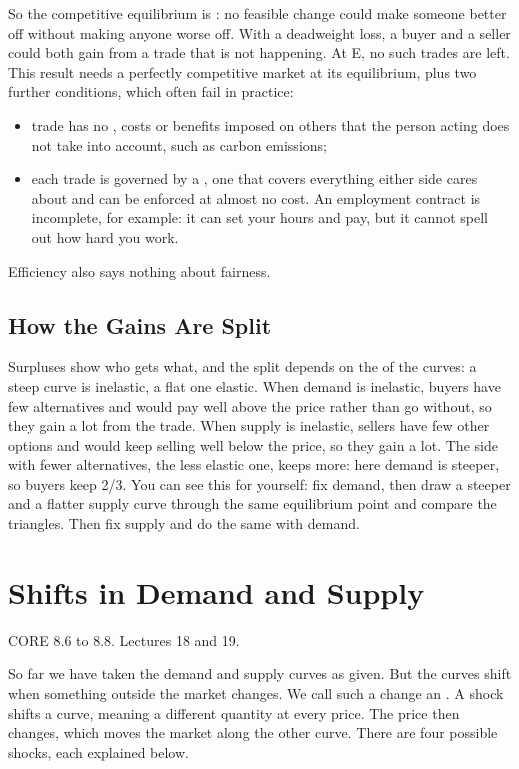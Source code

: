 \documentclass[11pt]{article}
\newcommand{\secinfo}[1]{{\small\color{muted}#1\par}\vspace{2pt}}
\begin{document}
So the competitive equilibrium is : no feasible change could make someone better off without making anyone worse off. With a deadweight loss, a buyer and a seller could both gain from a trade that is not happening. At E, no such trades are left. This result needs a perfectly competitive market at its equilibrium, plus two further conditions, which often fail in practice:
\begin{itemize}
\item trade has no , costs or benefits imposed on others that the person acting does not take into account, such as carbon emissions;
\item each trade is governed by a , one that covers everything either side cares about and can be enforced at almost no cost. An employment contract is incomplete, for example: it can set your hours and pay, but it cannot spell out how hard you work.
\end{itemize}
Efficiency also says nothing about fairness.

\subsection{How the Gains Are Split}

Surpluses show who gets what, and the split depends on the  of the curves: a steep curve is inelastic, a flat one elastic. When demand is inelastic, buyers have few alternatives and would pay well above the price rather than go without, so they gain a lot from the trade. When supply is inelastic, sellers have few other options and would keep selling well below the price, so they gain a lot. The side with fewer alternatives, the less elastic one, keeps more: here demand is steeper, so buyers keep 2/3. You can see this for yourself: fix demand, then draw a steeper and a flatter supply curve through the same equilibrium point and compare the triangles. Then fix supply and do the same with demand.

\section{Shifts in Demand and Supply}
\secinfo{CORE 8.6 to 8.8. Lectures 18 and 19.}

So far we have taken the demand and supply curves as given. But the curves shift when something outside the market changes. We call such a change an . A shock shifts a curve, meaning a different quantity at every price. The price then changes, which moves the market along the other curve. There are four possible shocks, each explained below.
\end{document}
